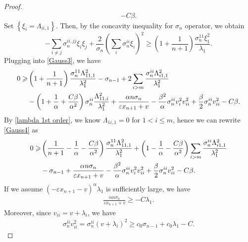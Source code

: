 \documentclass[reqno]{amsart}
\theoremstyle{remark}
\theoremstyle{definition}
\numberwithin{equation}{section}
\begin{document}
\begin{proof}
\begin{align}
        -C \beta.
    \end{align}
    Set $\left\{ \xi_i = \Lambda_{ii,1} \right\}$. Then, by the concavity inequality for $\sigma_n$ operator, we obtain
    \[
    -\sum_{i \neq j} \sigma_n^{ii,jj} \xi_i \xi_j + \frac{2}{\sigma_n} \left( \sum_i \sigma_n^{ii}\xi_i \right)^2 \geqslant \left( 1 + \frac{1}{n+1} \right) \frac{\sigma_n^{11}\xi_1^2}{\lambda_1}.
    \]
    Plugging into \eqref{Gauss3}, we have
    \begin{align}\label{Gauss4}
        0 \geqslant& 
        \left( 1 + \frac{1}{n+1} \right) \frac{\sigma_n^{11}\Lambda^2_{11,1}}{\lambda_1^2} 
        - \sigma_{n-1}
        + 2 \sum_{i > m} \frac{\sigma_n^{ii}\Lambda^2_{i1,1}}{\lambda_1^2} 
        \notag \\
        &- \left( 1+\frac{1}{\alpha}+\frac{C\beta}{\alpha^2} \right)\sigma_n^{ii} \frac{\Lambda_{11,i}^2}{\lambda_1^2} + \frac{\alpha n \sigma_n}{\varepsilon x_{n+1} + v} 
        - \frac{\beta^2}{\alpha} \sigma_n^{ii}v_{i}^2v_{ii}^2 
        + \frac{\beta}{2} \sigma_n^{ii}v_{ii}^2  
                -C \beta.
    \end{align}
    By \eqref{lambda 1st order}, we know $\Lambda_{1i,1} = 0$ for $1<i\leqslant m$, hence we can rewrite \eqref{Gauss4} as
    \begin{align}\label{Gauss5}
        0 \geqslant& 
        \left( \frac{1}{n+1} - \frac{1}{\alpha} - \frac{C\beta}{\alpha^2} \right) \frac{\sigma_n^{11}\Lambda^2_{11,1}}{\lambda_1^2} 
        + \left( 1 - \frac{1}{\alpha} - \frac{C\beta}{\alpha^2} \right) \sum_{i > m} \frac{\sigma_n^{ii}\Lambda^2_{i1,1}}{\lambda_1^2} 
        \notag \\
        &- \sigma_{n-1} + \frac{\alpha n \sigma_n}{\varepsilon x_{n+1} + v} 
        - \frac{\beta^2}{\alpha} \sigma_n^{ii}v_{i}^2v_{ii}^2 
        + \frac{\beta}{2} \sigma_n^{ii}v_{ii}^2 
        -C \beta.
    \end{align}
    If we assume $\left( -\varepsilon x_{n+1} - v \right)^{\alpha} \lambda_1$ is sufficiently large, we have
    \begin{align*}
        \frac{\alpha n \sigma_n}{\varepsilon x_{n+1} + v} \geqslant -C \lambda_1.
    \end{align*}
    Moreover, since $v_{ii} = v + \lambda_i$, we have
    \begin{align*}
        \sigma_n^{ii}v_{ii}^2 = \sigma_n^{ii}\left( v + \lambda_i \right)^2 \geqslant c_0 \sigma_{n-1} + c_0 \lambda_1 - C.
    \end{align*}

\end{proof}
\end{document}
